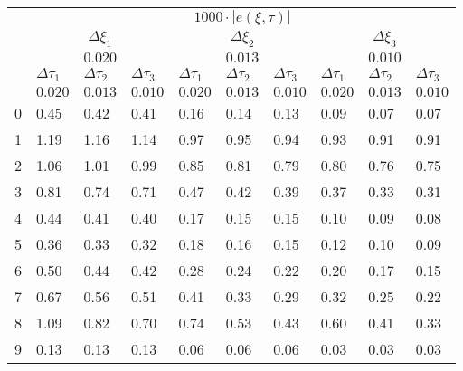 \begin{tabular}{llllllllll}
\toprule
{} & \multicolumn{9}{c}{$1000\cdot|e(ξ,\tau)|$} \\
{} & \multicolumn{3}{c}{$\Delta ξ_1$} & \multicolumn{3}{c}{$\Delta ξ_2$} & \multicolumn{3}{c}{$\Delta ξ_3$} \\
{} & \multicolumn{3}{c}{$0.020$} & \multicolumn{3}{c}{$0.013$} & \multicolumn{3}{c}{$0.010$} \\
{} &        $\Delta \tau_1$ & $\Delta \tau_2$ & $\Delta \tau_3$ & $\Delta \tau_1$ & $\Delta \tau_2$ & $\Delta \tau_3$ & $\Delta \tau_1$ & $\Delta \tau_2$ & $\Delta \tau_3$ \\
{} &                $0.020$ &         $0.013$ &         $0.010$ &         $0.020$ &         $0.013$ &         $0.010$ &         $0.020$ &         $0.013$ &         $0.010$ \\
\midrule
0 &                   0.45 &            0.42 &            0.41 &            0.16 &            0.14 &            0.13 &            0.09 &            0.07 &            0.07 \\
1 &                   1.19 &            1.16 &            1.14 &            0.97 &            0.95 &            0.94 &            0.93 &            0.91 &            0.91 \\
2 &                   1.06 &            1.01 &            0.99 &            0.85 &            0.81 &            0.79 &            0.80 &            0.76 &            0.75 \\
3 &                   0.81 &            0.74 &            0.71 &            0.47 &            0.42 &            0.39 &            0.37 &            0.33 &            0.31 \\
4 &                   0.44 &            0.41 &            0.40 &            0.17 &            0.15 &            0.15 &            0.10 &            0.09 &            0.08 \\
5 &                   0.36 &            0.33 &            0.32 &            0.18 &            0.16 &            0.15 &            0.12 &            0.10 &            0.09 \\
6 &                   0.50 &            0.44 &            0.42 &            0.28 &            0.24 &            0.22 &            0.20 &            0.17 &            0.15 \\
7 &                   0.67 &            0.56 &            0.51 &            0.41 &            0.33 &            0.29 &            0.32 &            0.25 &            0.22 \\
8 &                   1.09 &            0.82 &            0.70 &            0.74 &            0.53 &            0.43 &            0.60 &            0.41 &            0.33 \\
9 &                   0.13 &            0.13 &            0.13 &            0.06 &            0.06 &            0.06 &            0.03 &            0.03 &            0.03 \\
\bottomrule
\end{tabular}
